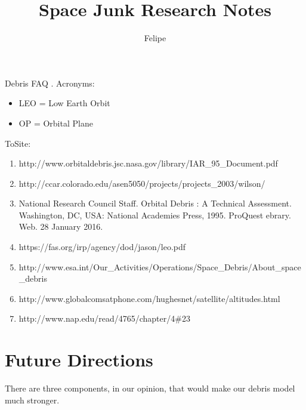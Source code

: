 \documentclass{article}
\title{Space Junk Research Notes}
\date{}
\author{Felipe}
\theoremstyle{definition}
\begin{document}
\maketitle 

Debris FAQ \cite{debrisFAQ}.
\linebreak
Acronyms:
\begin{itemize}
  \item LEO = Low Earth Orbit
  \item OP = Orbital Plane
\end{itemize}

ToSite:
\begin{enumerate}
  \item http://www.orbitaldebris.jsc.nasa.gov/library/IAR\_95\_Document.pdf 
  \item http://ccar.colorado.edu/asen5050/projects/projects\_2003/wilson/
  \item National Research Council Staff. Orbital Debris : A Technical Assessment. Washington, DC, USA: National Academies Press, 1995. ProQuest ebrary. Web. 28 January 2016.
  \item https://fas.org/irp/agency/dod/jason/leo.pdf
  \item http://www.esa.int/Our\_Activities/Operations/Space\_Debris/About\_space\_debris
  \item http://www.globalcomsatphone.com/hughesnet/satellite/altitudes.html
  \item http://www.nap.edu/read/4765/chapter/4\#23
\end{enumerate} 

\section{Future Directions}
There are three components, in our opinion, that would make our debris model much stronger.
\end{document}
